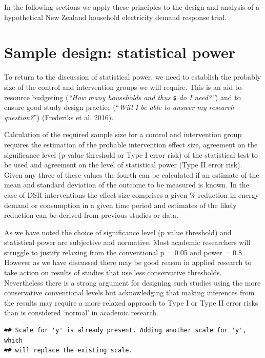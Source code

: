 \documentclass[]{article}
\theoremstyle{definition}
\theoremstyle{definition}
\theoremstyle{definition}
\theoremstyle{remark}
\begin{document}
In the following sections we apply these principles to the design and
analysis of a hypothetical New Zealand household electricity demand
response trial.

\section{Sample design: statistical
power}\label{sample-design-statistical-power}

To return to the discussion of statistical power, we need to establish
the probably size of the control and intervention groups we will
require. This is an aid to resource budgeting (\emph{``How many
households and thus \texttt{\$} do I need?''}) and to ensure good study
design practice (``\emph{Will I be able to answer my research
question?}'') (Frederiks et al. 2016).

Calculation of the required sample size for a control and intervention
group requires the estimation of the probable intervention effect size,
agreement on the significance level (p value threshold or Type I error
risk) of the statistical test to be used and agreement on the level of
statistical power (Type II error risk). Given any three of these values
the fourth can be calculated if an estimate of the mean and standard
deviation of the outcome to be measured is known. In the case of DSR
interventions the effect size comprises a given \% reduction in energy
demand or consumption in a given time period and estimates of the likely
reduction can be derived from previous studies or data.

As we have noted the choice of significance level (p value threshold)
and statistical power are subjective and normative. Most academic
researchers will struggle to justify relaxing from the conventional p =
0.05 and power = 0.8. However as we have discussed there may be good
reason in applied research to take action on results of studies that use
less conservative thresholds. Nevertheless there is a strong argument
for designing such studies using the more conservative conventional
levels but acknowledging that making inferences from the results may
require a more relaxed approach to Type I or Type II error risks than is
considered `normal' in academic research.

\begin{verbatim}
## Scale for 'y' is already present. Adding another scale for 'y', which
## will replace the existing scale.
\end{verbatim}
\end{document}
